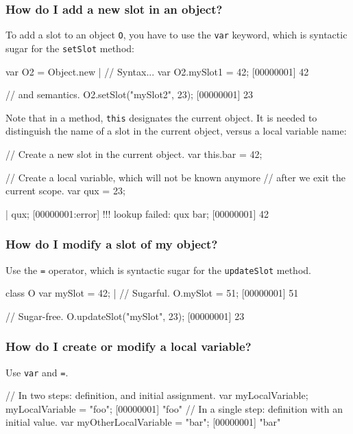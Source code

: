 \subsubsection{How do I add a new slot in an object?}
To add a slot to an object \lstinline{O}, you have to use the
\lstinline{var} keyword, which is syntactic sugar for the
\lstinline{setSlot} method:

\begin{urbiscript}
var O2 = Object.new |
// Syntax...
var O2.mySlot1 = 42;
[00000001] 42

// and semantics.
O2.setSlot("mySlot2", 23);
[00000001] 23
\end{urbiscript}

Note that in a method, \lstinline{this} designates the current
object.  It is needed to distinguish the name of a slot in the current
object, versus a local variable name:

\begin{urbiscript}
{
  // Create a new slot in the current object.
  var this.bar = 42;

  // Create a local variable, which will not be known anymore
  // after we exit the current scope.
  var qux = 23;
}|
qux;
[00000001:error] !!! lookup failed: qux
bar;
[00000001] 42
\end{urbiscript}


\subsubsection{How do I modify a slot of my object?}
Use the \lstinline|=| operator, which is syntactic sugar for the
\lstinline|updateSlot| method.

\begin{urbiscript}
class O
{
  var mySlot = 42;
}|
// Sugarful.
O.mySlot = 51;
[00000001] 51

// Sugar-free.
O.updateSlot("mySlot", 23);
[00000001] 23
\end{urbiscript}

\subsubsection{How do I create or modify a local variable?}
Use \lstinline|var| and \lstinline|=|.

\begin{urbiscript}
// In two steps: definition, and initial assignment.
var myLocalVariable;
myLocalVariable = "foo";
[00000001] "foo"
// In a single step: definition with an initial value.
var myOtherLocalVariable = "bar";
[00000001] "bar"
\end{urbiscript}


